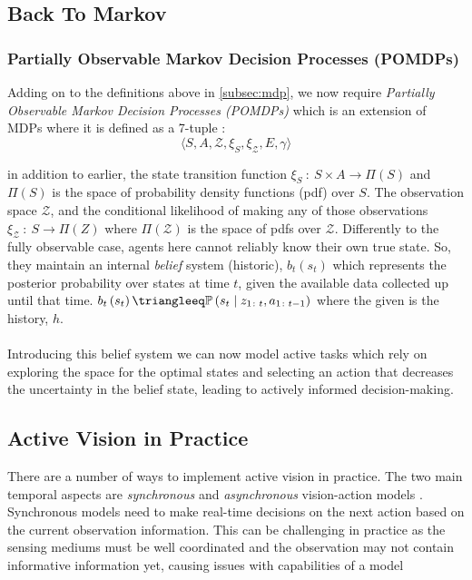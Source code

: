   \subsection{Back To Markov}
  \subsubsection{Partially Observable Markov Decision 
  \label{subsec:pomdp}
  Processes (POMDPs)}
  Adding on to the definitions above in \ref{subsec:mdp}, we now require \emph{Partially Observable Markov Decision Processes (POMDPs)} 
  which is an extension of MDPs where it is defined as a 7-tuple \cite{thrun2002probabilistic,placed2023surveyactivesimultaneouslocalization}: 
  \[\langle S, A, \mathcal{Z}, \xi_S, \xi_{\mathcal{Z}}, E, \gamma \rangle \]
  
  in addition to earlier, the state transition function \( \xi_S ~\colon~ S \times A \rightarrow \Pi\left(S\right)\) and $\Pi\left(S\right)$ is the space of probability density functions (pdf) over $S$. The observation space $\mathcal{Z}$, and the conditional likelihood of making any of those observations \(\xi_{\mathcal{Z}} ~\colon~ S \rightarrow \Pi\left(Z\right)\) where $\Pi\left(\mathcal{Z}\right)$ is the space of pdfs over $\mathcal{Z}$.
  Differently to the fully observable case, agents here cannot reliably know their own true state. So, they maintain an internal \emph{belief} system (historic), $b_t\left(s_t\right)$ which represents the posterior probability over states at time $t$, given the available data collected up until that time. \(b_t\left(s_t\right) \triangleeq  \mathbb{P}\left(s_t \mid z_{1 \colon t}, a_{1 \colon t - 1}\right)\) where the given is the history, $h$.
  \\\\
  Introducing this belief system we can now model active tasks which rely on exploring the space for the optimal states and selecting an action that decreases the uncertainty in the belief state, leading to actively informed decision-making.

  
  \subsection{Active Vision in Practice}
  There are a number of ways to implement active vision in practice. The two main temporal aspects are \emph{synchronous} and \emph{asynchronous} vision-action models \cite{divyaHandEyeCoordsination}. Synchronous models need to make real-time decisions on the next action based on the current observation information. This can be challenging in practice as the sensing mediums must be well coordinated and the observation may not contain informative information yet, causing issues with capabilities of a model

